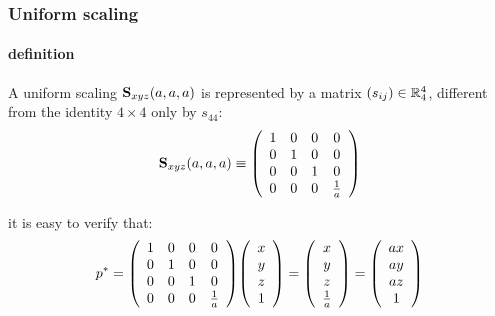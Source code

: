 \documentclass{beamer}
\begin{document}
\begin{frame}\frametitle{Uniform scaling} 
\framesubtitle{definition} \small

\vfill

A uniform scaling ${\bf S}_{xyz}(a,a,a)$ is represented by a matrix $(s_{ij})\in\mathbb{R}^{4}_{4}$, different from the identity $4\times 4$ only  by $s_{44}$:
\[
{\bf S}_{xyz}(a,a,a) \equiv {\left(\begin{array}{cccccccccccccccccccccccccccc}
1 & 0 & 0 & 0\\
0 & 1 & 0 & 0\\
0 & 0 & 1 & 0\\
0 & 0 & 0 & 1\over a
\end{array}\right)}
\]

\vfill

it is easy to verify that:
\[
p^* =
{\left(\begin{array}{cccccccccccccccccccccccccccc}
1 & 0 & 0 & 0\\
0 & 1 & 0 & 0\\
0 & 0 & 1 & 0\\
0 & 0 & 0 & 1\over a
\end{array}\right)}
{\left(\begin{array}{cccccccccccccccccccc} x \\ y \\ z \\ 1\end{array}\right)}
=
{\left(\begin{array}{cccccccccccccccccccc} x \\ y \\ z \\ 1\over a\end{array}\right)}
=
{\left(\begin{array}{cccccccccccccccccccc} ax \\ ay \\ az \\ 1\end{array}\right)}
\]

\vfill

\end{frame}

\end{document}
